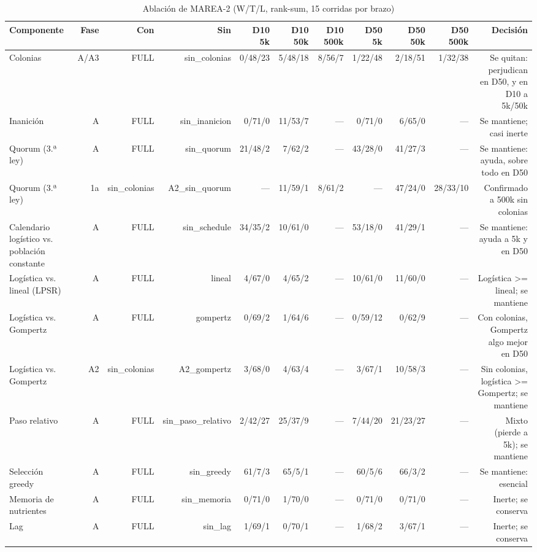 \begin{table}[ht]\centering\small
\caption{Ablación de MAREA-2 (W/T/L, rank-sum, 15 corridas por brazo)}
\begin{tabular}{lrrrrrrrrrr}
\toprule
Componente & Fase & Con & Sin & D10 5k & D10 50k & D10 500k & D50 5k & D50 50k & D50 500k & Decisión \\
\midrule
Colonias & A/A3 & FULL & sin\_colonias & 0/48/23 & 5/48/18 & 8/56/7 & 1/22/48 & 2/18/51 & 1/32/38 & Se quitan: perjudican en D50, y en D10 a 5k/50k \\
Inanición & A & FULL & sin\_inanicion & 0/71/0 & 11/53/7 & — & 0/71/0 & 6/65/0 & — & Se mantiene; casi inerte \\
Quorum (3.ª ley) & A & FULL & sin\_quorum & 21/48/2 & 7/62/2 & — & 43/28/0 & 41/27/3 & — & Se mantiene: ayuda, sobre todo en D50 \\
Quorum (3.ª ley) & 1a & sin\_colonias & A2\_sin\_quorum & — & 11/59/1 & 8/61/2 & — & 47/24/0 & 28/33/10 & Confirmado a 500k sin colonias \\
Calendario logístico vs. población constante & A & FULL & sin\_schedule & 34/35/2 & 10/61/0 & — & 53/18/0 & 41/29/1 & — & Se mantiene: ayuda a 5k y en D50 \\
Logística vs. lineal (LPSR) & A & FULL & lineal & 4/67/0 & 4/65/2 & — & 10/61/0 & 11/60/0 & — & Logística >= lineal; se mantiene \\
Logística vs. Gompertz & A & FULL & gompertz & 0/69/2 & 1/64/6 & — & 0/59/12 & 0/62/9 & — & Con colonias, Gompertz algo mejor en D50 \\
Logística vs. Gompertz & A2 & sin\_colonias & A2\_gompertz & 3/68/0 & 4/63/4 & — & 3/67/1 & 10/58/3 & — & Sin colonias, logística >= Gompertz; se mantiene \\
Paso relativo & A & FULL & sin\_paso\_relativo & 2/42/27 & 25/37/9 & — & 7/44/20 & 21/23/27 & — & Mixto (pierde a 5k); se mantiene \\
Selección greedy & A & FULL & sin\_greedy & 61/7/3 & 65/5/1 & — & 60/5/6 & 66/3/2 & — & Se mantiene: esencial \\
Memoria de nutrientes & A & FULL & sin\_memoria & 0/71/0 & 1/70/0 & — & 0/71/0 & 0/71/0 & — & Inerte; se conserva \\
Lag & A & FULL & sin\_lag & 1/69/1 & 0/70/1 & — & 1/68/2 & 3/67/1 & — & Inerte; se conserva \\

\end{tabular}
\end{table}
